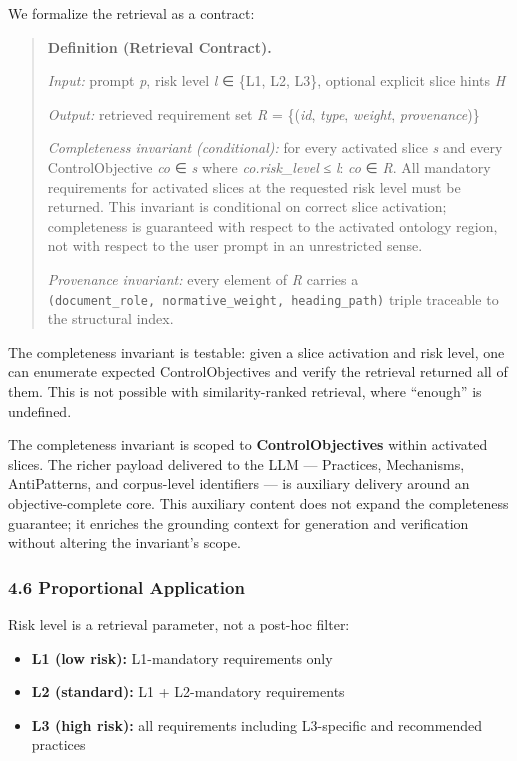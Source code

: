 \documentclass[
]{article}
\providecommand{\tightlist}{%
  \setlength{\itemsep}{0pt}\setlength{\parskip}{0pt}}
\begin{document}
We formalize the retrieval as a contract:

\begin{quote}
\textbf{Definition (Retrieval Contract).}

\emph{Input:} prompt \emph{p}, risk level \emph{l} ∈ \{L1, L2, L3\},
optional explicit slice hints \emph{H}

\emph{Output:} retrieved requirement set \emph{R} = \{(\emph{id},
\emph{type}, \emph{weight}, \emph{provenance})\}

\emph{Completeness invariant (conditional):} for every activated slice
\emph{s} and every ControlObjective \emph{co} ∈ \emph{s} where
\emph{co.risk\_level} ≤ \emph{l}: \emph{co} ∈ \emph{R}. All mandatory
requirements for activated slices at the requested risk level must be
returned. This invariant is conditional on correct slice activation;
completeness is guaranteed with respect to the activated ontology
region, not with respect to the user prompt in an unrestricted sense.

\emph{Provenance invariant:} every element of \emph{R} carries a
\texttt{(document\_role,\ normative\_weight,\ heading\_path)} triple
traceable to the structural index.
\end{quote}

The completeness invariant is testable: given a slice activation and
risk level, one can enumerate expected ControlObjectives and verify the
retrieval returned all of them. This is not possible with
similarity-ranked retrieval, where ``enough'' is undefined.

The completeness invariant is scoped to \textbf{ControlObjectives}
within activated slices. The richer payload delivered to the LLM ---
Practices, Mechanisms, AntiPatterns, and corpus-level identifiers --- is
auxiliary delivery around an objective-complete core. This auxiliary
content does not expand the completeness guarantee; it enriches the
grounding context for generation and verification without altering the
invariant's scope.

\subsubsection{4.6 Proportional
Application}\label{proportional-application}

Risk level is a retrieval parameter, not a post-hoc filter:

\begin{itemize}
\tightlist
\item
  \textbf{L1 (low risk):} L1-mandatory requirements only
\item
  \textbf{L2 (standard):} L1 + L2-mandatory requirements
\item
  \textbf{L3 (high risk):} all requirements including L3-specific and
  recommended practices
\end{itemize}
\end{document}
